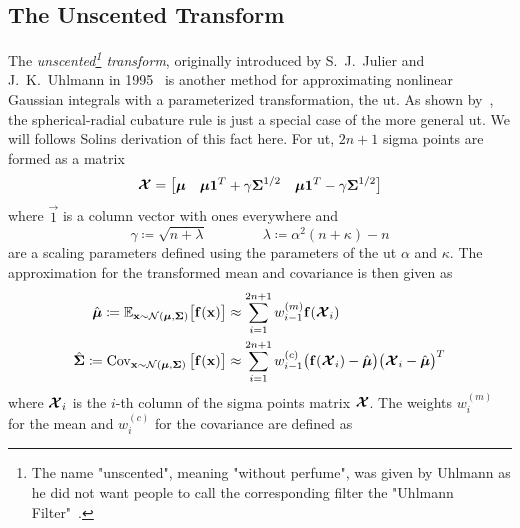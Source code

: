 	\subsection{The Unscented Transform}
		The \emph{unscented\footnote{The name "unscented", meaning "without perfume", was given by Uhlmann as he did not want people to call the corresponding filter the "Uhlmann Filter"~\cite{FirstHandUnscentedTransform}.} transform}, originally introduced by S.~J.~Julier and J.~K.~Uhlmann in 1995~\cite{julierNewApproachFiltering1995} is another method for approximating nonlinear Gaussian integrals with a parameterized transformation, the \ac{ut}. As shown by~\cite{solinCubatureIntegrationMethods2010}, the spherical-radial cubature rule is just a special case of the more general \ac{ut}. We will follows Solins derivation of this fact here. For \ac{ut}, \( 2n + 1 \) sigma points are formed as a matrix
		\begin{equation}
			\boldsymbol{\mathrm{\mathcal{X}}} =
				\begin{bmatrix}
					\boldsymbol{\mathrm{\mu}} & \boldsymbol{\mathrm{\mu}} \boldsymbol{\mathrm{1}}^T + \gamma \boldsymbol{\mathrm{\Sigma}}^{1/2} & \boldsymbol{\mathrm{\mu}} \boldsymbol{\mathrm{1}}^T - \gamma \boldsymbol{\mathrm{\Sigma}}^{1/2}
				\end{bmatrix}  \label{eqn:utSigmaPoints}
		\end{equation}
		where \( \vec{1} \) is a column vector with ones everywhere and
		\begin{equation*}
			\gamma \coloneqq \sqrt{n + \lambda} \qquad\qquad \lambda \coloneqq \alpha^2 (n + \kappa) - n
		\end{equation*}
		are a scaling parameters defined using the parameters of the \ac{ut} \( \alpha \) and \( \kappa \). The approximation for the transformed mean and covariance is then given as
		\begin{align}
			\hat{\boldsymbol{\mathrm{\mu}}} \coloneqq \mathbb{E}_{\boldsymbol{\mathrm{x}} \sim \mathcal{N}(\boldsymbol{\mathrm{\mu}}, \boldsymbol{\mathrm{\Sigma}})}\big[ \boldsymbol{\mathrm{f}}(\boldsymbol{\mathrm{x}}) \big] &\approx \sum_{i = 1}^{2n + 1} w_{i - 1}^{(m)} \boldsymbol{\mathrm{f}}(\boldsymbol{\mathrm{\mathcal{X}}}_i)  \label{eqn:utMean} \\
			\hat{\boldsymbol{\mathrm{\Sigma}}} \coloneqq \operatorname{Cov}_{\boldsymbol{\mathrm{x}} \sim \mathcal{N}(\boldsymbol{\mathrm{\mu}}, \boldsymbol{\mathrm{\Sigma}})}\big[ \boldsymbol{\mathrm{f}}(\boldsymbol{\mathrm{x}}) \big] &\approx \sum_{i = 1}^{2n + 1} w_{i - 1}^{(c)} \big( \boldsymbol{\mathrm{f}}(\boldsymbol{\mathrm{\mathcal{X}}}_i) - \hat{\boldsymbol{\mathrm{\mu}}} \big) \big( \boldsymbol{\mathrm{\mathcal{X}}}_i - \hat{\boldsymbol{\mathrm{\mu}}} \big)^T  \label{eqn:utCov}
		\end{align}
		where \( \boldsymbol{\mathrm{\mathcal{X}}}_i \) is the \(i\)-th column of the sigma points matrix \( \boldsymbol{\mathrm{\mathcal{X}}} \). The weights \( w_i^{(m)} \) for the mean and \( w_i^{(c)} \) for the covariance are defined as
